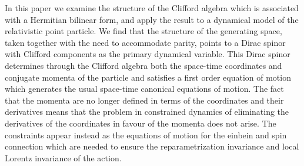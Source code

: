 \documentclass[a4paper,a4paper]{article}
\begin{document}
In this paper we examine the structure of the Clifford algebra which is
associated with a Hermitian bilinear form, and apply the result to a dynamical
model of the relativistic point particle. We find that the structure of the
generating space, taken together with the need to accommodate parity, points to
a Dirac spinor with Clifford components as the primary dynamical variable. This
Dirac spinor determines through the Clifford algebra both the space-time
coordinates and conjugate momenta of the particle and satisfies a first order
equation of motion which generates the usual space-time canonical equations of
motion. The fact that the momenta are no longer defined in terms of the
coordinates and their derivatives means that the problem in constrained dynamics
of eliminating the derivatives of the coordinates in favour of the momenta does
not arise. The constraints appear instead as the equations of motion for the
einbein and spin connection which are needed to ensure the reparametrization
invariance and local Lorentz invariance of the action.     
\end{document}
